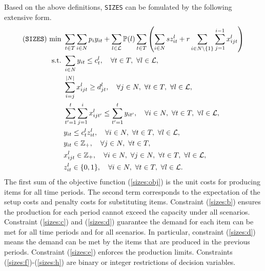 Based on the above definitions, \texttt{SIZES} can be fomulated by the following extensive form.
\begin{subequations}
	\begin{align}
	(\texttt{SIZES})\ \textrm{min}\ &\sum_{t\in T}\sum_{i\in N} p_i y_{it} + \sum_{l\in \mathcal{L}} \PP(l)\sum_{t\in T}\left(\sum_{i\in N} sz_{it}^l+r\sum_{i\in N\backslash\{1\}}\sum_{j=1}^{i-1}x_{ijt}^l\right) \label{sizes:obj}\\
	\textrm{s.t.}\ &\sum_{i\in N}y_{it}\le c_{t}^l,\quad \forall t\in T,\ \forall l\in \mathcal{L}, \label{sizes:b}\\
	&\sum_{i=j}^{|N|} x_{ijt}^l \ge d_{jt}^l,\quad\forall j\in N,\ \forall t\in T,\  \forall l\in \mathcal{L},\label{sizes:c}\\
	&\sum_{t'=1}^{t}\sum_{j=1}^{i}x_{ijt'}^l\le\sum_{t'=1}^{t}y_{it'}, \quad\forall i\in N,\ \forall t\in T,\ \forall l\in \mathcal{L},\label{sizes:d}\\
	&y_{it}\le c_{t}^l z_{it}^l,\quad\forall i \in N,\ \forall t\in T,\ \forall l\in \mathcal{L},\label{sizes:e}\\
	&y_{it}\in\mathbb{Z}_+,\quad \forall j\in N,\ \forall t\in T,\label{sizes:f}\\
	&x_{ijt}^l\in\mathbb{Z}_+,\quad\forall i\in N,\ \forall j\in N,\ \forall t\in T,\ \forall l\in \mathcal{L},\label{sizes:g}\\
	&z_{it}^l\in\{0,1\},\quad\forall i\in N,\ \forall t\in T,\ \forall l\in \mathcal{L}.\label{sizes:h}
	\end{align}
\end{subequations}
The first sum of the objective function (\ref{sizes:obj}) is the unit costs for producing items for all time periods. The second term corresponds to the expectation of the setup costs and penalty costs for substituting items. Constraint (\ref{sizes:b}) ensures the production for each period cannot exceed the capacity under all scenarios. Constraint (\ref{sizes:c}) and (\ref{sizes:d}) guarantee the demand for each item can be met for all time periods and for all scenarios. In particular, constraint (\ref{sizes:d}) means the demand can be met by the items that are produced in the previous periods. Constraint (\ref{sizes:e}) enforces the production limits. Constraints (\ref{sizes:f})-(\ref{sizes:h}) are binary or integer restrictions of decision variables.
